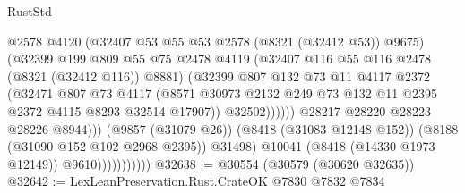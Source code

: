 \begin{lexlean}{RustStd}
\begin{coremodule}
                                          @2578
                                          @4120
                                          (@32407 @53 @55 @53 @2578 (@8321 (@32412 @53)) @9675)
                                          (@32399
                                            @199
                                            @809
                                            @55
                                            @75
                                            @2478
                                            @4119
                                            (@32407 @116 @55 @116 @2478 (@8321 (@32412 @116)) @8881)
                                            (@32399
                                              @807
                                              @132
                                              @73
                                              @11
                                              @4117
                                              @2372
                                              (@32471
                                                @807
                                                @73
                                                @4117
                                                (@8571
                                                  @30973
                                                  @2132
                                                  @249
                                                  @73
                                                  @132
                                                  @11
                                                  @2395
                                                  @2372
                                                  @4115
                                                  @8293
                                                  @32514
                                                  @17907))
                                              @32502))))))
                                  @28217
                                  @28220
                                  @28223
                                  @28226
                                  @8944)))
                            (@9857 (@31079 @26))
                            (@8418 (@31083 @12148 @152))
                            (@8188 (@31090 @152 @102 @2968 @2395))
                            @31498)
                          @10041
                          (@8418 (@14330 @1973 @12149))
                          @9610)))))))))))
@32638 := @30554 (@30579 (@30620 @32635))
@32642 := LexLeanPreservation.Rust.CrateOK @7830 @7832 @7834

\end{coremodule}
\end{lexlean}
